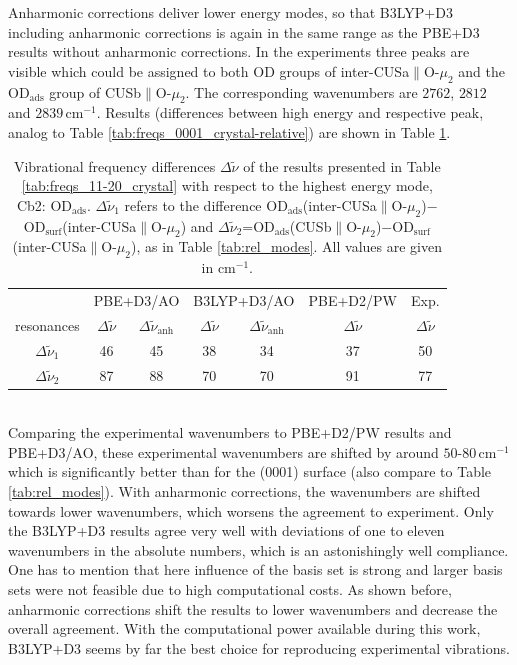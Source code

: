 \documentclass[11pt,DIV=13,BCOR=5mm,a4paper,headinclude]{scrbook}
\begin{document}
Anharmonic corrections deliver lower energy modes, so that B3LYP+D3 including anharmonic corrections is again in the same range as the PBE+D3 results without anharmonic corrections.
In the experiments \cite{Heiden11-20_2018} three peaks are visible which could be assigned to both OD groups of inter-CUSa$\parallel$O-$\mu_2$ and the OD$_\textrm{ads}$ group of CUSb$\parallel$O-$\mu_2$.
The corresponding wavenumbers are $2762$, $2812$ and $2839\,$cm$^{-1}$.
Results (differences between high energy and respective peak, analog to Table \ref{tab:freqs_0001_crystal-relative}) are shown in Table \ref{tab:freqs_11-20_crystal-relative}.
\begin{table}[!h]
  \centering
  \caption{Vibrational frequency differences $\Delta \tilde{\nu}$ of the results presented in Table \ref{tab:freqs_11-20_crystal} with respect to the highest energy mode, Cb2: OD$_\textrm{ads}$.
  $\Delta \tilde{\nu}_1$ refers to the difference OD$_\textrm{ads}$(inter-CUSa$\parallel$O-$\mu_2$)$-$OD$_\textrm{surf}$(inter-CUSa$\parallel$O-$\mu_2$) and $\Delta \tilde{\nu}_2$=OD$_\textrm{ads}$(CUSb$\parallel$O-$\mu_2$)$-$OD$_\textrm{surf}$(inter-CUSa$\parallel$O-$\mu_2$), as in Table \ref{tab:rel_modes}.
All values are given in cm$^{-1}$.}
  \begin{tabular}{c|cc|cc|c|c}
  \toprule
   & \multicolumn{2}{c}{PBE+D3/AO} & \multicolumn{2}{c}{B3LYP+D3/AO}&PBE+D2/PW&Exp.\cite{Heiden11-20_2018}\\
  resonances & $\Delta\tilde{\nu}$  & $\Delta\tilde{\nu}_\textrm{anh}$ &  $\Delta\tilde{\nu}$  & $\Delta\tilde{\nu}_\textrm{anh}$&$\Delta\tilde{\nu}$  &$\Delta\tilde{\nu}$\\\midrule
$\Delta \tilde{\nu}_1$ & 46 & 45 & 38 & 34 & 37 & 50\\
$\Delta \tilde{\nu}_2$  & 87 & 88 & 70 & 70 & 91 & 77\\\bottomrule
    \end{tabular}
  \label{tab:freqs_11-20_crystal-relative}
\end{table}
\\

Comparing the experimental wavenumbers to PBE+D2/PW results and PBE+D3/AO, these experimental wavenumbers are shifted by around $50$-$80\,$cm$^{-1}$ which is significantly better than for the (0001) surface (also compare to Table \ref{tab:rel_modes}).
With anharmonic corrections, the wavenumbers are shifted towards lower wavenumbers, which worsens the agreement to experiment.
Only the B3LYP+D3 results agree very well with deviations of one to eleven wavenumbers in the absolute numbers, which is an astonishingly well compliance.
One has to mention that here influence of the basis set is strong and larger basis sets were not feasible due to high computational costs.
As shown before, anharmonic corrections shift the results to lower wavenumbers and decrease the overall agreement.
With the computational power available during this work, B3LYP+D3 seems by far the best choice for reproducing experimental vibrations.
\end{document}

